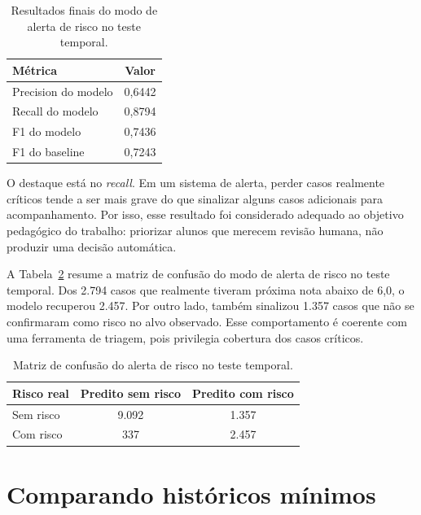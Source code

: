 \begin{table}[ht]
\caption{Resultados finais do modo de alerta de risco no teste temporal.}
\label{tab:riscos}
\centering
\begin{tabular}{l c}
\hline
\textbf{M\'etrica} & \textbf{Valor} \\
\hline
Precision do modelo & 0,6442 \\
Recall do modelo & 0,8794 \\
F1 do modelo & 0,7436 \\
F1 do baseline & 0,7243 \\
\hline
\end{tabular}
\end{table}

O destaque est\'a no \textit{recall}. Em um sistema de alerta, perder casos realmente cr\'iticos tende a ser mais grave do que sinalizar alguns casos adicionais para acompanhamento. Por isso, esse resultado foi considerado adequado ao objetivo pedag\'ogico do trabalho: priorizar alunos que merecem revis\~ao humana, n\~ao produzir uma decis\~ao autom\'atica.

A Tabela~\ref{tab:matriz-risco} resume a matriz de confus\~ao do modo de alerta de risco no teste temporal. Dos 2.794 casos que realmente tiveram pr\'oxima nota abaixo de 6,0, o modelo recuperou 2.457. Por outro lado, tamb\'em sinalizou 1.357 casos que n\~ao se confirmaram como risco no alvo observado. Esse comportamento \'e coerente com uma ferramenta de triagem, pois privilegia cobertura dos casos cr\'iticos.

\begin{table}[ht]
\caption{Matriz de confus\~ao do alerta de risco no teste temporal.}
\label{tab:matriz-risco}
\centering
\begin{tabular}{l c c}
\hline
\textbf{Risco real} & \textbf{Predito sem risco} & \textbf{Predito com risco} \\
\hline
Sem risco & 9.092 & 1.357 \\
Com risco & 337 & 2.457 \\
\hline
\end{tabular}
\end{table}

\section{Comparando hist\'oricos m\'inimos}
\label{sec:minhistory}

